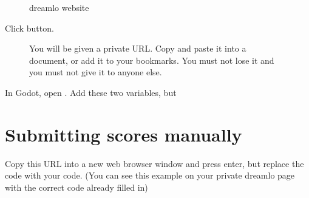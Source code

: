 \documentclass[a4paper,12pt,english]{sphinxmanual}
\begin{document}
\begin{figure}[htbp]
\centering
\capstart

\noindent{}
\caption{dreamlo website}\label{\detokenize{tutorial:id9}}\end{figure}

\sphinxAtStartPar
Click  button.

\begin{figure}[htbp]
\centering
\capstart

\noindent{}
\caption{You will be given a private URL. Copy and paste it into a document,
or add it to your bookmarks. You must not lose it and you must not
give it to anyone else.}\label{\detokenize{tutorial:id10}}\end{figure}

\sphinxAtStartPar
In Godot, open . Add these two variables, but 

\begin{sphinxVerbatim}[commandchars=\\\{\}]
   
   
\end{sphinxVerbatim}


\section{Submitting scores manually}
\label{\detokenize{tutorial:submitting-scores-manually}}
\sphinxAtStartPar
Copy this URL into a new web browser window and press enter, but replace
the code with your  code. (You can see this example on your
private dreamlo page with the correct code already filled in)

\begin{sphinxVerbatim}[commandchars=\\\{\}]
\end{sphinxVerbatim}
\end{document}
